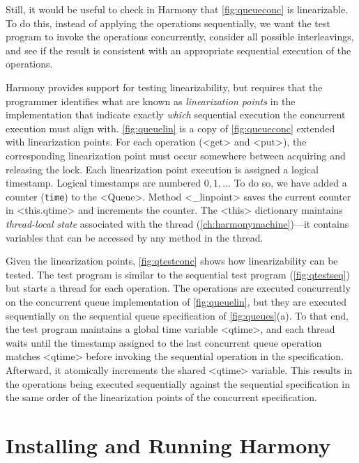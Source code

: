 \documentclass{report}
\begin{document}
Still, it would be useful to check in Harmony that
\autoref{fig:queueconc} is linearizable.
To do this, instead of applying the operations sequentially,
we want the test program to invoke the operations concurrently,
consider all possible interleavings, and see if the result
is consistent with an appropriate sequential execution of the
operations.

%
Harmony provides support for testing linearizability,
but requires that the programmer
identifies what are known as \emph{linearization points}
in the implementation that indicate exactly \emph{which} sequential
execution the concurrent execution must align with.
\autoref{fig:queuelin} is a copy of \autoref{fig:queueconc} extended with
linearization points.
For each operation (<{get}> and <{put}>), the corresponding
linearization point must occur somewhere between acquiring and releasing
the lock.
%
Each linearization point execution is assigned a logical timestamp.
Logical timestamps are numbered $0, 1, ...$
To do so, we have added a counter (\texttt{time}) to the <{Queue}>.
Method <{_linpoint}> saves the current counter in
<{this.qtime}> and increments the counter.
The <{this}> dictionary maintains \emph{thread-local state} associated
with the thread (\autoref{ch:harmonymachine})---it contains variables that
can be accessed by any method in the thread.

Given the linearization points, \autoref{fig:qtestconc} shows how
linearizability can be tested.
The test program is similar to the sequential test program
(\autoref{fig:qtestseq}) but starts a thread for each operation.
The operations are executed concurrently on the concurrent queue
implementation of \autoref{fig:queuelin}, but they are executed sequentially
on the sequential queue specification of \autoref{fig:queues}(a).
To that end, the test program maintains a global time variable
<{qtime}>, and each thread waits until the timestamp assigned to
the last concurrent queue operation matches <{qtime}> before invoking
the sequential operation in the specification.
Afterward, it atomically increments the shared <{qtime}> variable.
This results in the operations being executed sequentially against the
sequential specification in the same order of the linearization points
of the concurrent specification.

\chapter{Installing and Running Harmony}\label{ap:install}
\end{document}
